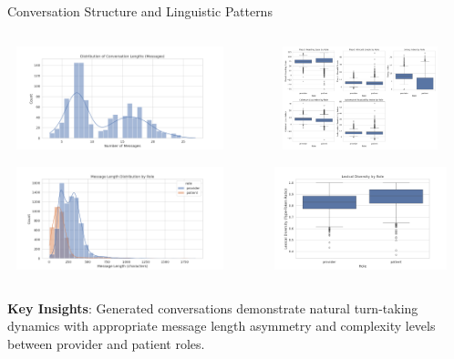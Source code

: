 \begin{frame}{Conversation Structure and Linguistic Patterns}
  \begin{columns}
    \begin{column}{0.5\textwidth}
      \begin{minipage}{\textwidth}
        \includegraphics[width=0.95\textwidth, height=3cm]{images/analysis/plots_advanced/conversation_length_messages.png}
      \end{minipage}
      
      \begin{minipage}{\textwidth}
        \includegraphics[width=0.95\textwidth, height=3cm]{images/analysis/plots/message_length_distribution.png}
      \end{minipage}
    \end{column}
    
    \begin{column}{0.5\textwidth}
      \begin{minipage}{\textwidth}
        \includegraphics[width=0.95\textwidth, height=3cm]{images/analysis/plots/readability_metrics.png}
      \end{minipage}
      \begin{minipage}{\textwidth}
        \includegraphics[width=0.95\textwidth, height=3cm]{images/analysis/plots/lexical_diversity.png}
      \end{minipage}
    \end{column}
  \end{columns}
  
  \footnotesize\textbf{Key Insights}: Generated conversations demonstrate natural turn-taking dynamics with appropriate message length asymmetry and complexity levels between provider and patient roles.
\end{frame}

